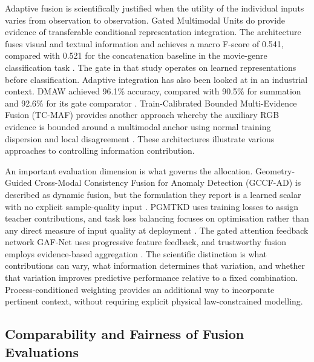 Adaptive fusion is scientifically justified when the utility of the individual inputs varies from
observation to observation.
Gated Multimodal Units do provide evidence of transferable conditional representation integration.
The architecture fuses visual and textual information and achieves a macro F-score of 0.541, compared
with 0.521 for the concatenation baseline in the movie-genre classification task \parencite[Section~3.1, Table~2]{P006}.
The gate in that study operates on learned representations before classification.
Adaptive integration has also been looked at in an industrial context. DMAW achieved 96.1\%
accuracy, compared with 90.5\% for summation and 92.6\% for its gate comparator \parencite[Table~V]{P003}.
Train-Calibrated Bounded Multi-Evidence Fusion (TC-MAF) provides another approach whereby the auxiliary RGB evidence is bounded around a multimodal
anchor using normal training dispersion and local disagreement \parencite[Section~3.3, Equations~2--4]{P026}.
These architectures illustrate various approaches to controlling information contribution.

An important evaluation dimension is what governs the allocation. Geometry-Guided Cross-Modal Consistency Fusion for Anomaly Detection (GCCF-AD) is described as dynamic
fusion, but the formulation they report is a learned scalar with no explicit sample-quality input
\parencite[p.~149226, Equation~8]{P038}.
PGMTKD uses training losses to assign teacher contributions, and task loss balancing focuses on
optimisation rather than any direct measure of input quality at deployment
\parencite{Li2025PGMTKD,P045}.
The gated attention feedback network GAF-Net uses progressive feature feedback, and trustworthy fusion employs evidence-based aggregation
\parencite{Huang2026Rolling,Ying2025Trustworthy}.
The scientific distinction is what contributions can vary, what information determines that
variation, and whether that variation improves predictive performance relative to a fixed
combination.
Process-conditioned weighting provides an additional way to incorporate pertinent context, without
requiring explicit physical law-constrained modelling.

\subsection{Comparability and Fairness of Fusion Evaluations}

